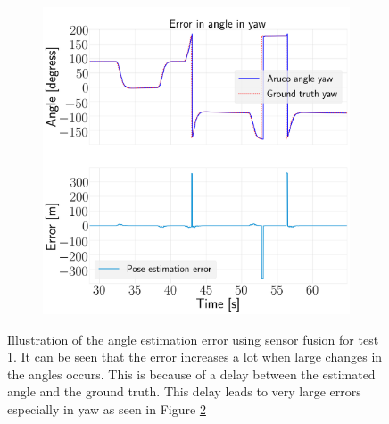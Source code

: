 \documentclass[../Head/report.tex]{subfiles}
\begin{document}
\begin{figure}[H]
\begin{subfigure}[t]{.30\textwidth}
        \caption{}
        \label{fig:vision_navigation_error_pitch}
    \end{subfigure}
     \hspace{0.2em}
    \begin{subfigure}[t]{.30\textwidth}
        \centering
        \includegraphics[width=\textwidth]{../Figures/vision_navigation/test1_full_pattern_board/error_yaw/pose_error_yaw_test1.png}
        \caption{}
        \label{fig:vision_navigation_error_yaw}
    \end{subfigure}
    \caption{Illustration of the angle estimation error using sensor fusion for test 1. It can be seen that the error increases a lot when large changes in the angles occurs. This is because of a delay between the estimated angle and the ground truth. This delay leads to very large errors especially in yaw as seen in Figure \ref{fig:vision_navigation_error_yaw}}
    \label{fig:vision_navigation_error_angle}
\end{figure}
\end{document}
